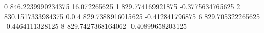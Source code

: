 0 846.2239990234375 16.072265625
1 829.774169921875 -0.3775634765625
2 830.1517333984375 0.0
4 829.7388916015625 -0.412841796875
6 829.705322265625 -0.4464111328125
8 829.7427368164062 -0.40899658203125
